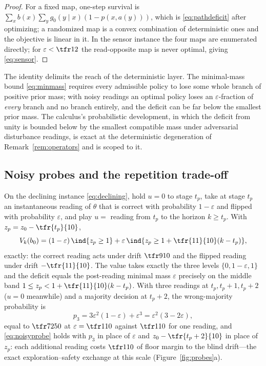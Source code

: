 \begin{proof}
For a fixed map, one-step survival is $\sum_x b(x)\sum_y g_0(y\mid x)(1-p(x,a(y)))$, which is \eqref{eq:pathdeficit} after optimizing; a randomized map is a convex combination of deterministic ones and the objective is linear in it. In the sensor instance the four maps are enumerated directly; for $\varepsilon<\tfr12$ the read-opposite map is never optimal, giving \eqref{eq:sensor}.
\end{proof}

The identity delimits the reach of the deterministic layer. The minimal-mass bound \eqref{eq:minmass} requires every admissible policy to lose some whole branch of positive prior mass; with noisy readings an optimal policy loses an $\varepsilon$-fraction of \emph{every} branch and no branch entirely, and the deficit can be far below the smallest prior mass. The calculus's probabilistic development, in which the deficit from unity is bounded below by the smallest compatible mass under adversarial disturbance readings, is exact at the deterministic degeneration of Remark~\ref{rem:operators} and is scoped to it.

\subsection{Noisy probes and the repetition trade-off}

\begin{proposition}\label{prop:noisyprobe}
On the declining instance \eqref{eq:declining}, hold $u=0$ to stage $t_p$, take at stage $t_p$ an instantaneous reading of $\theta$ that is correct with probability $1-\varepsilon$ and flipped with probability $\varepsilon$, and play $u=$ reading from $t_p$ to the horizon $k\ge t_p$. With $z_p=z_0-\tfr{t_p}{10}$,
\begin{equation}\label{eq:noisyprobe}
V_k(b_0)=(1-\varepsilon)\,\ind{z_p\ge1}+\varepsilon\,\ind{z_p\ge1+\tfr{11}{10}(k-t_p)} ,
\end{equation}
exactly: the correct reading acts under drift $\tfr9{10}$ and the flipped reading under drift $-\tfr{11}{10}$. The value takes exactly the three levels $\{0,1-\varepsilon,1\}$ and the deficit equals the post-reading minimal mass $\varepsilon$ precisely on the middle band $1\le z_p<1+\tfr{11}{10}(k-t_p)$. With three readings at $t_p,t_p+1,t_p+2$ ($u=0$ meanwhile) and a majority decision at $t_p+2$, the wrong-majority probability is
\begin{equation}\label{eq:majority3}
p_3=3\varepsilon^{2}(1-\varepsilon)+\varepsilon^{3}=\varepsilon^{2}(3-2\varepsilon),
\end{equation}
equal to $\tfr7{250}$ at $\varepsilon=\tfr1{10}$ against $\tfr1{10}$ for one reading, and \eqref{eq:noisyprobe} holds with $p_3$ in place of $\varepsilon$ and $z_0-\tfr{t_p+2}{10}$ in place of $z_p$: each additional reading costs $\tfr1{10}$ of floor margin to the blind drift---the exact exploration--safety exchange at this scale (Figure~\ref{fig:probes}a).
\end{proposition}

